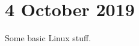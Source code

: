 \documentclass[main.tex]{subfiles}
\begin{document}
\section*{4 October 2019}

Some basic Linux stuff.
\end{document}
